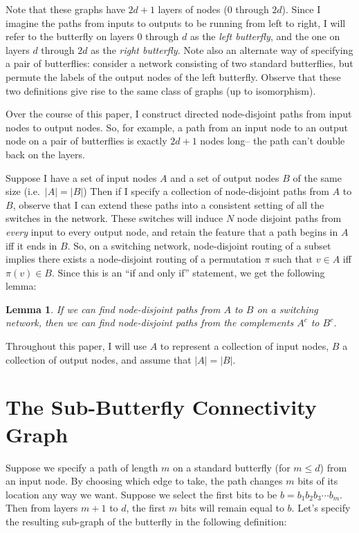 \documentclass[12pt]{article}
\newtheorem{lemma}{Lemma}
\begin{document}
Note that these graphs have $2d+1$ layers of
nodes (0 through $2d$).  Since I imagine the paths from inputs to outputs
to be running from 
left to right, I will refer to the butterfly on layers 0 through $d$ as
the \emph{left butterfly}, and the one on layers $d$ through $2d$ as the
\emph{right butterfly}.  Note also an alternate way of specifying
a pair of butterflies: consider a network consisting of
two standard butterflies, but permute the labels of the output nodes
of the left butterfly.  
Observe that these two definitions give rise to the same class of 
graphs (up to isomorphism).

Over the course of this paper, I construct directed node-disjoint 
paths from input nodes to output nodes.  So, for example, a path from an 
input
node to an output node on a pair of butterflies is exactly $2d+1$ nodes
long-- the path can't double back on the layers.  

Suppose I have a set of input nodes $A$ and a set of output nodes $B$ of the
same size (i.e.\ $|A|=|B|$)
Then if I specify a collection of node-disjoint paths from $A$ to $B$, observe
that I can extend these paths into a consistent setting of all the 
switches in the network.  These switches will induce $N$  node disjoint
paths from \emph{every} input to every output node, and retain the
feature that a path begins in $A$ iff it ends in $B$.  So, on a
switching network, node-disjoint routing of a subset implies there
exists a node-disjoint routing of a permutation $\pi$ such that 
$v\in A$ iff $\pi(v)\in B$.  Since this is an ``if and only if'' statement,
we get the following lemma:
\begin{lemma} \label{set complement}
If we can find node-disjoint paths from $A$ to $B$ on a switching
network, then we can find node-disjoint paths from the complements
$A^{c}$ to $B^{c}$.
\end{lemma}
Throughout this paper, I will use $A$ to represent a collection of
input nodes, $B$ a collection of output nodes, and assume that
$|A|=|B|$.

\section{The Sub-Butterfly Connectivity Graph} \label{connectivity}

Suppose we specify a path of length $m$ on a standard butterfly 
(for $m\leq d$) from an input node.
By choosing which edge to take, the path changes $m$ bits of its
location any way we want.  Suppose we select the first bits to be
$b=b_{1}b_{2}b_{3}\cdots b_{m}$.  Then from layers $m+1$ to $d$, 
the first $m$ bits will remain equal to $b$.  Let's specify 
the resulting sub-graph of the butterfly in the following definition:
\end{document}
